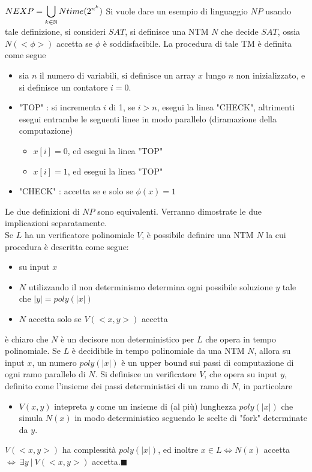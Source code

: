 \documentclass[10pt, letterpaper]{report}
\begin{document}
 $\displaystyle NEXP=\bigcup_{k\in{\mathbb N}}Ntime(2^{n^k})$\acc
Si vuole dare un esempio di linguaggio $NP$ usando tale definizione, si consideri $SAT$, si definisce una NTM $N$ che decide $SAT$, ossia $N(<\phi>)$ accetta se $\phi$ è soddisfacibile. La procedura di tale TM è definita come segue\begin{itemize}
    \item sia $n$ il numero di variabili, si definisce un array $x$ lungo $n$ non inizializzato, e si definisce un contatore $i=0$. 
    \item "TOP" : si incrementa $i$ di 1, se $i>n$, esegui la linea "CHECK", altrimenti esegui entrambe le seguenti linee in modo parallelo (diramazione della computazione)\begin{itemize}
        \item $x[i]=0$, ed esegui la linea "TOP"
        \item $x[i]=1$, ed esegui la linea "TOP"
    \end{itemize}
    \item "CHECK" : accetta se e solo se $\phi(x)=1$
\end{itemize}
\teo{} Le due definizioni di $NP$ sono equivalenti.\acc 
\dimo{} Verranno dimostrate le due implicazioni separatamente.\\ 
\boxedMath{$\implies$} Se $L$ ha un verificatore polinomiale $V$, è possibile definire una NTM $N$ la cui procedura è descritta come segue:\begin{itemize}
    \item su input $x$
    \item $N$ utilizzando il non determinismo determina ogni possibile soluzione $y$ tale che $|y|=poly(|x|)$
    \item $N$ accetta solo se $V(<x,y>)$ accetta 
\end{itemize}
è chiaro che $N$ è un decisore non deterministico per $L$ che opera in tempo polinomiale.\acc 
\boxedMath{$\impliedby$} Se $L$ è decidibile in tempo polinomiale da una NTM $N$, allora su input $x$, un numero $poly(|x|)$ è un upper bound sui passi di computazione di ogni ramo parallelo di $N$. Si definisce un verificatore $V$, che opera su input $y$, definito come l'insieme dei passi deterministici di un ramo di $N$, in particolare\begin{itemize}
    \item $V(x,y)$ intepreta $y$ come un insieme di (al più) lunghezza $poly(|x|)$ che simula $N(x)$ in modo deterministico seguendo le scelte di "fork" determinate da $y$. 
\end{itemize}
$V(<x,y>)$ ha complessità $poly(|x|)$, ed inoltre $x\in L \iff N(x)$ accetta $\iff \ \exists y \ | \ V(<x,y>)$  accetta.\hfill$\blacksquare$
\flowerLine 
\end{document}
